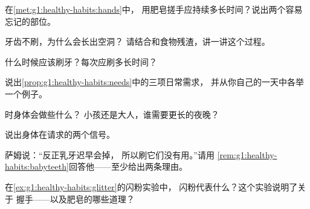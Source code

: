 \begin{exercise}[$\star$]\label{exo:g1:healthy-habits:3}
在\cref{met:g1:healthy-habits:hands}中，
用肥皂搓手应持续多长时间？说出两个容易忘记的部位。
\end{exercise}

\begin{exercise}[$\star$]\label{exo:g1:healthy-habits:4}
牙齿不刷，为什么会长出空洞？
请结合和食物残渣，讲一讲这个过程。
\end{exercise}

\begin{exercise}[$\star$]\label{exo:g1:healthy-habits:5}
什么时候应该刷牙？每次应刷多长时间？
\end{exercise}

\begin{exercise}[$\star$]\label{exo:g1:healthy-habits:6}
说出\cref{prop:g1:healthy-habits:needs}中的三项日常需求，
并从你自己的一天中各举一个例子。
\end{exercise}

\begin{exercise}[$\star$]\label{exo:g1:healthy-habits:7}
时身体会做些什么？
小孩还是大人，谁需要更长的夜晚？
\end{exercise}

\begin{exercise}[$\star$]\label{exo:g1:healthy-habits:8}
说出身体在请求的两个信号。
\end{exercise}

\begin{exercise}[$\star\star$]\label{exo:g1:healthy-habits:9}
萨姆说：“反正乳牙迟早会掉，
所以刷它们没有用。”请用
\cref{rem:g1:healthy-habits:babyteeth}回答他——至少给出两条理由。
\end{exercise}

\begin{exercise}[$\star\star$]\label{exo:g1:healthy-habits:10}
在\cref{ex:g1:healthy-habits:glitter}的闪粉实验中，
闪粉代表什么？这个实验说明了关于
握手——以及肥皂的哪些道理？
\end{exercise}
